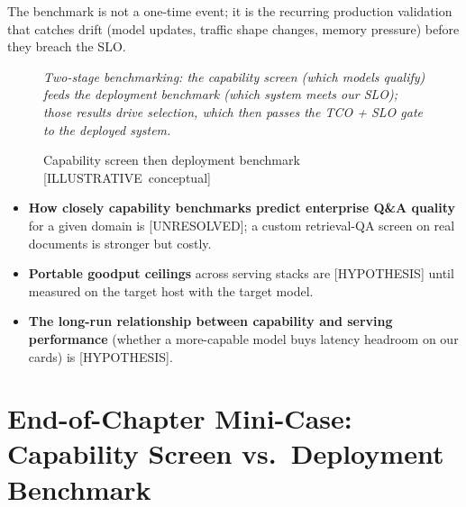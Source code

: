 The benchmark is not a one-time event; it is the recurring production
validation that catches drift (model updates, traffic shape changes,
memory pressure) before they breach the SLO.

\begin{figure}
\centering
{}
\caption{Capability screen then deployment benchmark \mbox{{[}ILLUSTRATIVE conceptual{]}}}

\label{fig:14.1}\emph{Two-stage benchmarking: the capability screen (which models
qualify) feeds the deployment benchmark (which system meets our SLO);
those results drive selection, which then passes the TCO + SLO gate to
the deployed system.}

\end{figure}\label{what-we-still-dont-know}


\begin{itemize}
\tightlist
\item
  \textbf{How closely capability benchmarks predict enterprise Q\&A
  quality} for a given domain is \mbox{{[}UNRESOLVED{]}}; a custom retrieval-QA
  screen on real documents is stronger but costly.
\item
  \textbf{Portable goodput ceilings} across serving stacks are
  \mbox{{[}HYPOTHESIS{]}} until measured on the target host with the target
  model.
\item
  \textbf{The long-run relationship between capability and serving
  performance} (whether a more-capable model buys latency headroom on
  our cards) is \mbox{{[}HYPOTHESIS{]}}.
\end{itemize}

\section{End-of-Chapter Mini-Case: Capability Screen vs.~Deployment
Benchmark}\label{end-of-chapter-mini-case-capability-screen-vs.-deployment-benchmark}

